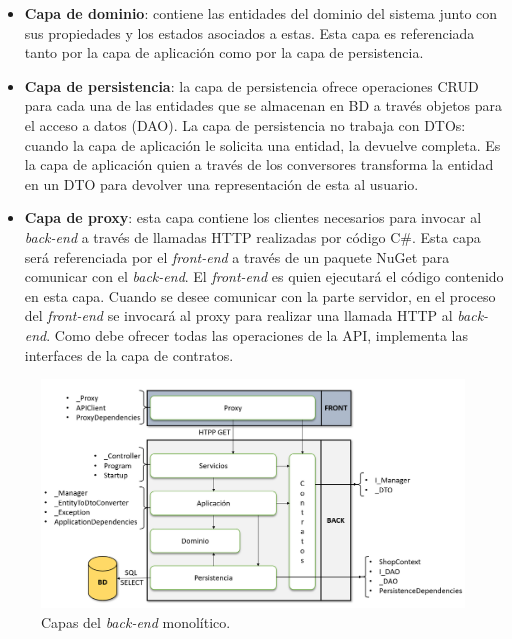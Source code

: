 \documentclass[11pt,spanish,listoffigures]{tfgetsinf}
\begin{document}
\begin{itemize}
\item \textbf{Capa de dominio}: contiene las entidades del dominio del sistema junto con sus propiedades y los estados asociados a estas. Esta capa es referenciada tanto por la capa de aplicación como por la capa de persistencia.

\item \textbf{Capa de persistencia}: la capa de persistencia ofrece operaciones CRUD para cada una de las entidades que se almacenan en BD a través objetos para el acceso a datos (DAO). La capa de persistencia no trabaja con DTOs: cuando la capa de aplicación le solicita una entidad, la devuelve completa. Es la capa de aplicación quien a través de los conversores transforma la entidad en un DTO para devolver una representación de esta al usuario.

\item \textbf{Capa de proxy}: esta capa contiene los clientes necesarios para invocar al \textit{back-end} a través de llamadas HTTP realizadas por código C\#. Esta capa será referenciada por el \textit{front-end} a través de un paquete NuGet para comunicar con el \textit{back-end}. El \textit{front-end} es quien ejecutará el código contenido en esta capa. Cuando se desee comunicar con la parte servidor, en el proceso del \textit{front-end} se invocará al proxy para realizar una llamada HTTP al \textit{back-end}. Como debe ofrecer todas las operaciones de la API, implementa las interfaces de la capa de contratos.

\end{itemize}

\begin{figure}[h]
\centering
\includegraphics[scale=0.5]{capas}
\caption{Capas del \textit{back-end} monolítico.}
\label{fig:capas}
\end{figure}
\end{document}
